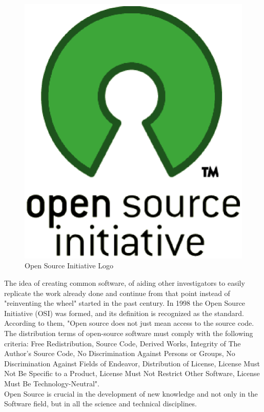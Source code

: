 \begin{figure}[h]
	\begin{center}
    \includegraphics[scale=0.3]{img/intro/osi.eps}
	\caption[Open Source Initiative Logo]{Open Source Initiative Logo}
	\end{center}
\end{figure}


The idea of creating common software, of aiding other investigators to easily replicate the work already done and continue from that point instead of "reinventing the wheel" started in the past century. In 1998 the Open Source Initiative (OSI)\cite{osi} was formed, and its definition is recognized as the standard. According to them, "Open source does not just mean access to the source code. The distribution terms of open-source software must comply with the following criteria: Free Redistribution, Source Code, Derived Works, Integrity of The Author's Source Code, No Discrimination Against Persons or Groups, No Discrimination Against Fields of Endeavor, Distribution of License, License Must Not Be Specific to a Product, License Must Not Restrict Other Software,  License Must Be Technology-Neutral"\cite{osi_def}. 
\\

Open Source is crucial in the development of new knowledge and not only in the Software field, but in all the science and technical disciplines. 



